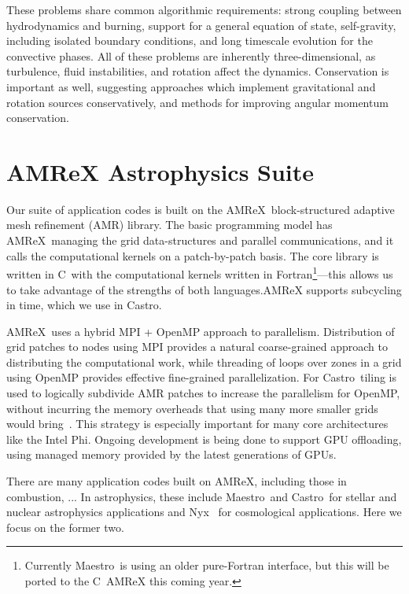 \documentclass[a4paper]{jpconf}
\newcommand{\maestro}{{\sffamily Maestro}}
\newcommand{\castro}{{\sffamily Castro}}
\newcommand{\nyx}{{\sffamily Nyx}}
\newcommand{\amrex}{{\sffamily AMReX}}
\newcommand{\cpp}{C\nolinebreak\hspace{-.05em}\raisebox{.4ex}{\tiny\bf +}\nolinebreak\hspace{-.10em}\raisebox{.4ex}{\tiny\bf +}}
\newcommand{\MarginPar}[1]{\marginpar{\vskip-\baselineskip\raggedright\tiny\sffamily\hrule\smallskip{\color{red}#1}\par\smallskip\hrule}}
\begin{document}
These problems share common algorithmic requirements: strong coupling
between hydrodynamics and burning, support for a general equation of state,
self-gravity, including isolated boundary conditions, and long timescale
evolution for the convective phases.  All of these problems are inherently
three-dimensional, as turbulence, fluid instabilities, and rotation affect
the dynamics.  Conservation is important as well, suggesting approaches
which implement gravitational and rotation sources conservatively, and
methods for improving angular momentum conservation.


\section{AMReX Astrophysics Suite}

Our suite of application codes is built on the
\amrex\ block-structured adaptive mesh refinement (AMR) library.  The
basic programming model has \amrex\ managing the grid data-structures
and parallel communications, and it calls the computational kernels on
a patch-by-patch basis.  The core library is written in \cpp\ with the
computational kernels written in Fortran\footnote{Currently
  \maestro\ is using an older pure-Fortran interface, but this will be
  ported to the \cpp\ AMReX this coming year.}---this allows us to take
advantage of the strengths of both languages.AMReX supports subcycling
in time, which we use in \castro.

\amrex\ uses a hybrid MPI + OpenMP approach to parallelism.
Distribution of grid patches to nodes using MPI provides a natural
coarse-grained approach to distributing the computational work, while
threading of loops over zones in a grid using OpenMP provides
effective fine-grained parallelization.  For \castro\, tiling is used
to logically subdivide AMR patches to increase the parallelism for
OpenMP, without incurring the memory overheads that using many more
smaller grids would bring~\cite{tiling}.  This strategy is especially
important for many core architectures like the Intel Phi.  Ongoing
development is being done to support GPU offloading, using managed
memory provided by the latest generations of GPUs.

There are many application codes built on \amrex, including those in
combustion, ... \MarginPar{domains?} In astrophysics, these include \maestro\ and
\castro\ for stellar and nuclear astrophysics applications and
\nyx~\cite{nyx} for cosmological applications.  Here we focus on the
former two.
\end{document}
